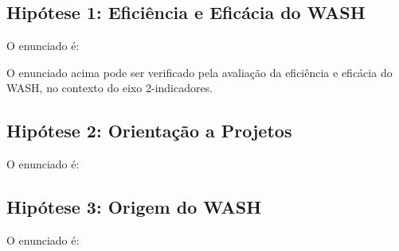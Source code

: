 \documentclass[
12pt,		%
openright,	%
twoside,  %
a4paper,			%
chapter=TITLE,		%
english,			%
french,				%
spanish,			%
brazil				%
]{USPSC-classe/USPSC}
\begin{document}
\subsection[Hip\'otese 1: Efici\^encia e Efic\'acia do WASH]{Hip\'otese 1: Efici\^encia e Efic\'acia do WASH}\label{Hip\'otese 1: Efici\^encia e Efic\'acia do WASH}
O enunciado \'e:










\noindent\begin{center}\mbox{\centering{}}\end{center}


O enunciado acima pode ser verificado pela avalia\c{c}\~ao da efici\^encia e efic\'acia do WASH, no contexto do eixo 2-indicadores.









\subsection[Hip\'otese 2: Orienta\c{c}\~ao a Projetos]{Hip\'otese 2: Orienta\c{c}\~ao a Projetos}\label{Hip\'otese 2: Orienta\c{c}\~ao a Projetos}
O enunciado \'e:










\noindent\begin{center}\mbox{\centering{}}\end{center}


\subsection[Hip\'otese 3: Origem do WASH]{Hip\'otese 3: Origem do WASH}\label{Hip\'otese 3: Origem do WASH}
O enunciado \'e:
\end{document}
